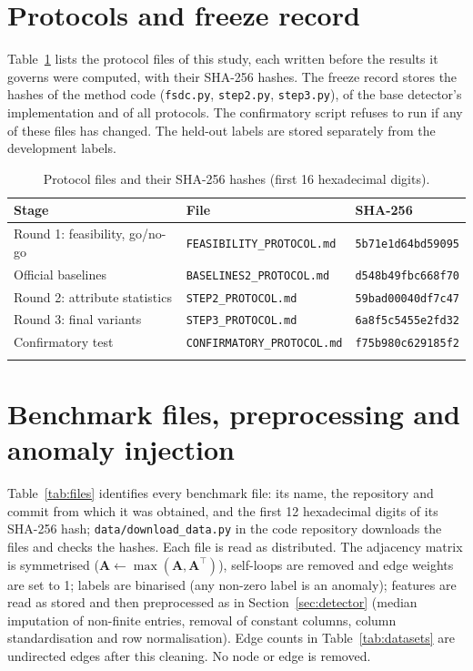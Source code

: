 \documentclass[pdflatex,sn-mathphys-ay]{sn-jnl}
\theoremstyle{plain}
\theoremstyle{remark}
\begin{document}
\begin{appendices}



\section{Protocols and freeze record}\label{app:prereg}

Table~\ref{tab:hashes} lists the protocol files of this study, each written before the results it governs were computed, with their SHA-256 hashes. The freeze record stores the hashes of the method code (\texttt{fsdc.py}, \texttt{step2.py}, \texttt{step3.py}), of the base detector's implementation and of all protocols. The confirmatory script refuses to run if any of these files has changed. The held-out labels are stored separately from the development labels.

\begin{table}[h]
\caption{Protocol files and their SHA-256 hashes (first 16 hexadecimal digits).}
\label{tab:hashes}
\footnotesize
\begin{tabular}{@{}lll@{}}
\toprule
Stage & File & SHA-256 \\
\midrule
Round 1: feasibility, go/no-go & \texttt{FEASIBILITY\_PROTOCOL.md} & \texttt{5b71e1d64bd59095} \\
Official baselines & \texttt{BASELINES2\_PROTOCOL.md} & \texttt{d548b49fbc668f70} \\
Round 2: attribute statistics & \texttt{STEP2\_PROTOCOL.md} & \texttt{59bad00040df7c47} \\
Round 3: final variants & \texttt{STEP3\_PROTOCOL.md} & \texttt{6a8f5c5455e2fd32} \\
Confirmatory test & \texttt{CONFIRMATORY\_PROTOCOL.md} & \texttt{f75b980c629185f2} \\
\botrule
\end{tabular}
\end{table}

\section{Benchmark files, preprocessing and anomaly injection}\label{app:data}
\setcounter{table}{0}

Table~\ref{tab:files} identifies every benchmark file: its name, the repository and commit from which it was obtained, and the first 12 hexadecimal digits of its SHA-256 hash; \texttt{data/download\_data.py} in the code repository downloads the files and checks the hashes. Each file is read as distributed. The adjacency matrix is symmetrised ($\mathbf{A}\leftarrow\max(\mathbf{A},\mathbf{A}^{\top})$), self-loops are removed and edge weights are set to 1; labels are binarised (any non-zero label is an anomaly); features are read as stored and then preprocessed as in Section~\ref{sec:detector} (median imputation of non-finite entries, removal of constant columns, column standardisation and row normalisation). Edge counts in Table~\ref{tab:datasets} are undirected edges after this cleaning. No node or edge is removed.


\end{appendices}
\end{document}
